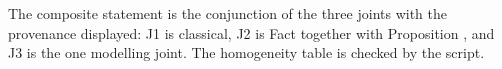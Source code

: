 The composite statement is the conjunction of the three joints with the provenance displayed: J1 is classical, J2 is Fact  together with Proposition , and J3 is the one modelling joint. The homogeneity table is checked by the script.
